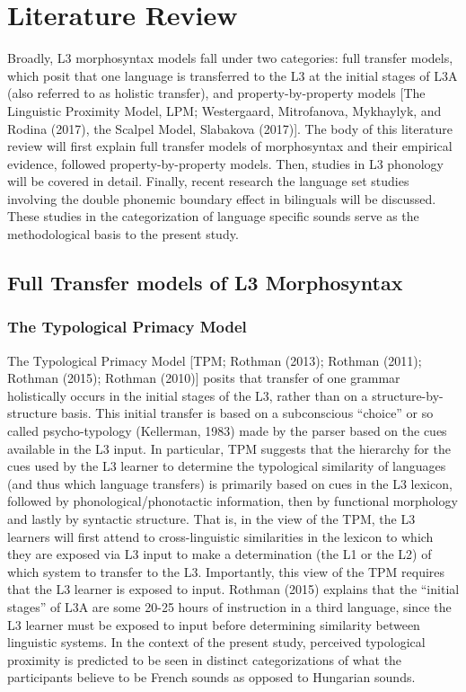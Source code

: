 \documentclass[
  english,
  man]{apa6}
\begin{document}
\hypertarget{literature-review}{%
\section{Literature Review}\label{literature-review}}

Broadly, L3 morphosyntax models fall under two categories: full transfer models, which posit that one language is transferred to the L3 at the initial stages of L3A (also referred to as holistic transfer), and property-by-property models {[}The Linguistic Proximity Model, LPM; Westergaard, Mitrofanova, Mykhaylyk, and Rodina (2017), the Scalpel Model, Slabakova (2017){]}. The body of this literature review will first explain full transfer models of morphosyntax and their empirical evidence, followed property-by-property models.
Then, studies in L3 phonology will be covered in detail.
Finally, recent research the language set studies involving the double phonemic boundary effect in bilinguals will be discussed. These studies in the categorization of language specific sounds serve as the methodological basis to the present study.

\hypertarget{full-transfer-models-of-l3-morphosyntax}{%
\subsection{Full Transfer models of L3 Morphosyntax}\label{full-transfer-models-of-l3-morphosyntax}}

\hypertarget{the-typological-primacy-model}{%
\subsubsection{The Typological Primacy Model}\label{the-typological-primacy-model}}

The Typological Primacy Model {[}TPM; Rothman (2013); Rothman (2011); Rothman (2015); Rothman (2010){]} posits that transfer of one grammar holistically occurs in the initial stages of the L3, rather than on a structure-by-structure basis.
This initial transfer is based on a subconscious ``choice'' or so called psycho-typology (Kellerman, 1983) made by the parser based on the cues available in the L3 input.
In particular, TPM suggests that the hierarchy for the cues used by the L3 learner to determine the typological similarity of languages (and thus which language transfers) is primarily based on cues in the L3 lexicon, followed by phonological/phonotactic information, then by functional morphology and lastly by syntactic structure.
That is, in the view of the TPM, the L3 learners will first attend to cross-linguistic similarities in the lexicon to which they are exposed via L3 input to make a determination (the L1 or the L2) of which system to transfer to the L3.
Importantly, this view of the TPM requires that the L3 learner is exposed to input.
Rothman (2015) explains that the ``initial stages'' of L3A are some 20-25 hours of instruction in a third language, since the L3 learner must be exposed to input before determining similarity between linguistic systems.
In the context of the present study, perceived typological proximity is predicted to be seen in distinct categorizations of what the participants believe to be French sounds as opposed to Hungarian sounds.
\end{document}
